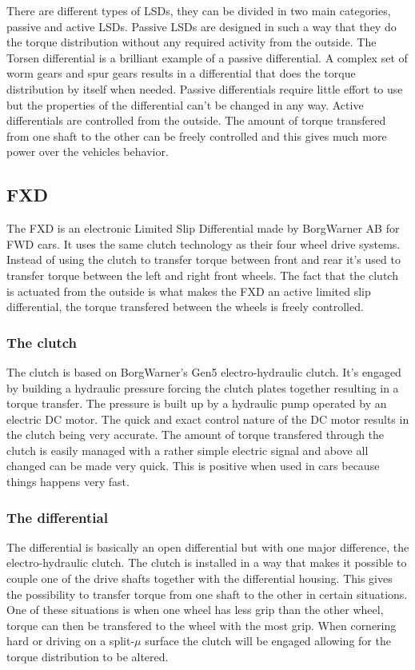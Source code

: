 There are different types of LSDs, they can be divided in two main categories, passive and active LSDs. Passive LSDs are designed in such a way that they do the torque distribution without any required activity from the outside. The Torsen differential is a brilliant example of a passive differential. A complex set of worm gears and spur gears results in a differential that does the torque distribution by itself when needed. Passive differentials require little effort to use but the properties of the differential can't be changed in any way. Active differentials are controlled from the outside. The amount of torque transfered from one shaft to the other can be freely controlled and this gives much more power over the vehicles behavior.

\subsection{FXD}
The FXD is an electronic Limited Slip Differential made by BorgWarner AB for FWD cars. It uses the same clutch technology as their four wheel drive systems. Instead of using the clutch to transfer torque between front and rear it's used to transfer torque between the left and right front wheels. The fact that the clutch is actuated from the outside is what makes the FXD an active limited slip differential, the torque transfered between the wheels is freely controlled.

\subsubsection{The clutch}
The clutch is based on BorgWarner's Gen5 electro-hydraulic clutch. It's engaged by building a hydraulic pressure forcing the clutch plates together resulting in a torque transfer. The pressure is built up by a hydraulic pump operated by an electric DC motor. The quick and exact control nature of the DC motor results in the clutch being very accurate. The amount of torque transfered through the clutch is easily managed with a rather simple electric signal and above all changed can be made very quick. This is positive when used in cars because things happens very fast.

\subsubsection{The differential}
The differential is basically an open differential but with one major difference, the electro-hydraulic clutch. The clutch is installed in a way that makes it possible to couple one of the drive shafts together with the differential housing. This gives the possibility to transfer torque from one shaft to the other in certain situations. One of these situations is when one wheel has less grip than the other wheel, torque can then be transfered to the wheel with the most grip. When cornering hard or driving on a split-$ \mu $ surface the clutch will be engaged allowing for the torque distribution to be altered.

